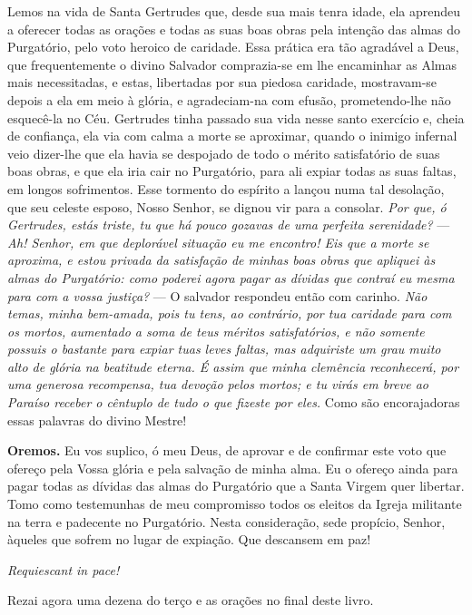 Lemos na vida de Santa Gertrudes que, desde sua mais tenra idade, ela aprendeu a oferecer todas as orações e todas as suas boas obras pela intenção das almas do Purgatório, pelo voto heroico de caridade. Essa prática era tão agradável a Deus, que frequentemente o divino Salvador comprazia-se em lhe encaminhar as Almas mais necessitadas, e estas, libertadas por sua piedosa caridade, mostravam-se depois a ela em meio à glória, e  agradeciam-na com efusão, prometendo-lhe não esquecê-la no Céu. Gertrudes tinha passado sua vida nesse santo exercício e, cheia de confiança, ela via com calma a morte se aproximar, quando o inimigo infernal veio dizer-lhe que ela havia se despojado de todo o mérito satisfatório de suas boas obras, e que ela iria cair no Purgatório, para ali expiar todas as suas faltas, em longos sofrimentos. Esse tormento do espírito a lançou numa tal desolação, que seu celeste esposo, Nosso Senhor, se dignou vir para a consolar. \textit{Por que, ó Gertrudes, estás triste, tu que há pouco gozavas de uma perfeita serenidade?} --- \textit{Ah! Senhor, em que deplorável situação eu me encontro! Eis que a morte se aproxima, e estou privada da satisfação de minhas boas obras que apliquei às almas do Purgatório: como poderei agora pagar as dívidas que contraí eu mesma para com a vossa justiça?} --- O salvador respondeu então com carinho. \textit{Não temas, minha bem-amada, pois tu tens, ao contrário, por tua caridade para com os mortos, aumentado a soma de teus méritos satisfatórios, e não somente possuis o bastante para expiar tuas leves faltas, mas adquiriste um grau muito alto de glória na beatitude eterna. É assim que minha clemência reconhecerá, por uma generosa recompensa, tua devoção pelos mortos; e tu virás em breve ao Paraíso receber o cêntuplo de tudo o que fizeste por eles.} Como são encorajadoras essas palavras do divino Mestre!


\vspace{\baselineskip}\noindent \textbf{Oremos.} Eu vos suplico, ó meu Deus, de aprovar e de confirmar este voto que ofereço pela Vossa glória e pela salvação de minha alma. Eu o ofereço ainda para pagar todas as dívidas das almas do Purgatório que a Santa Virgem quer libertar. Tomo como testemunhas de meu compromisso todos os eleitos da Igreja militante na terra e padecente no Purgatório. Nesta consideração, sede propício, Senhor, àqueles que sofrem no lugar de expiação. Que descansem em paz!



\begin{center}
\textit{Requiescant in pace!}
\end{center}

Rezai agora uma dezena do terço e as orações no final deste livro.
